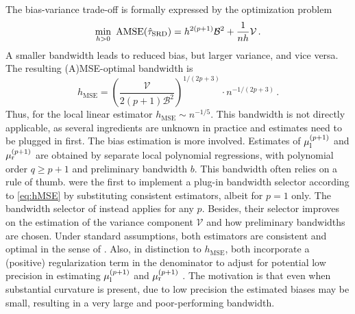 The bias-variance trade-off is formally expressed by the optimization problem
\begin{equation}
	\min_{h>0} \,\, \operatorname{AMSE}(\hat{\tau}_{\textup{SRD}}) = h^{2(p+1)} \mathcal{B}^2 + \frac{1}{nh} \mathcal{V} \,.
\end{equation}
A smaller bandwidth leads to reduced bias, but larger variance, and vice versa.
The resulting (A)MSE-optimal bandwidth is
\begin{equation} \label{eq:hMSE}
	h_{\text{MSE}} = \left( \frac{\mathcal{V}}{2(p+1) \mathcal{B}^2} \right)^{1/(2p+3)} \cdot n^{-1/(2p+3)} \,.
\end{equation}
Thus, for the local linear estimator $h_{\text{MSE}} \sim n^{-1/5}$.
This bandwidth is not directly applicable, as several ingredients are unknown in practice and estimates need to be plugged in first.
The bias estimation is more involved.
Estimates of $\mu_{\textup{l}}^{(p+1)}$ and $\mu_{\textup{r}}^{(p+1)}$ are obtained by separate local polynomial regressions,
with polynomial order $q \geq p+1$ and preliminary bandwidth $b$.
This bandwidth often relies on a rule of thumb.
\textcite{Imbens_2012} were the first to implement a plug-in bandwidth selector according to \eqref{eq:hMSE}
by substituting consistent estimators, albeit for $p=1$ only.
The bandwidth selector of \textcite{Calonico_2014} instead applies for any $p$.
Besides, their selector improves on the estimation of the variance component $\mathcal{V}$ and how preliminary bandwidths are chosen.
Under standard assumptions, both estimators are consistent and optimal in the sense of \textcite{Li_1987}.
Also, in distinction to $h_{\text{MSE}}$, both incorporate a (positive) regularization term in the denominator
to adjust for potential low precision in estimating $\mu_{\textup{l}}^{(p+1)}$ and $\mu_{\textup{r}}^{(p+1)}$ \parencite[Section~4]{Imbens_2012}.
The motivation is that even when substantial curvature is present, due to low precision the estimated biases may be small,
resulting in a very large and poor-performing bandwidth.